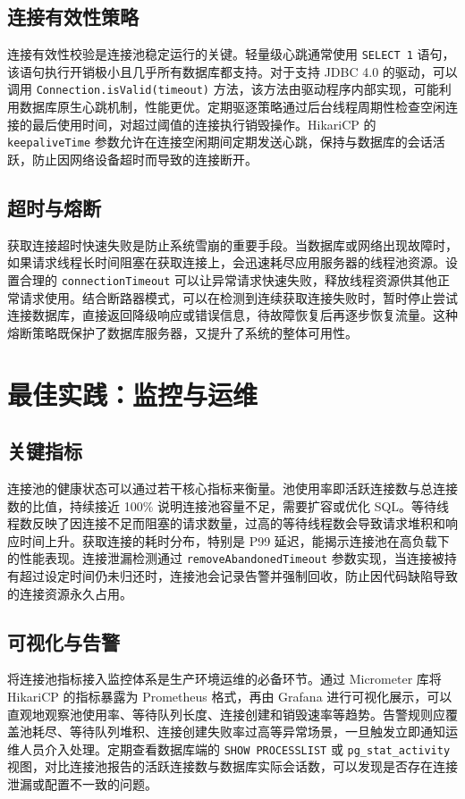 \section{连接有效性策略}
连接有效性校验是连接池稳定运行的关键。轻量级心跳通常使用 \texttt{SELECT 1} 语句，该语句执行开销极小且几乎所有数据库都支持。对于支持 JDBC 4.0 的驱动，可以调用 \texttt{Connection.isValid(timeout)} 方法，该方法由驱动程序内部实现，可能利用数据库原生心跳机制，性能更优。定期驱逐策略通过后台线程周期性检查空闲连接的最后使用时间，对超过阈值的连接执行销毁操作。HikariCP 的 \texttt{keepaliveTime} 参数允许在连接空闲期间定期发送心跳，保持与数据库的会话活跃，防止因网络设备超时而导致的连接断开。\par
\section{超时与熔断}
获取连接超时快速失败是防止系统雪崩的重要手段。当数据库或网络出现故障时，如果请求线程长时间阻塞在获取连接上，会迅速耗尽应用服务器的线程池资源。设置合理的 \texttt{connectionTimeout} 可以让异常请求快速失败，释放线程资源供其他正常请求使用。结合断路器模式，可以在检测到连续获取连接失败时，暂时停止尝试连接数据库，直接返回降级响应或错误信息，待故障恢复后再逐步恢复流量。这种熔断策略既保护了数据库服务器，又提升了系统的整体可用性。\par
\chapter{最佳实践：监控与运维}
\section{关键指标}
连接池的健康状态可以通过若干核心指标来衡量。池使用率即活跃连接数与总连接数的比值，持续接近 100\%{} 说明连接池容量不足，需要扩容或优化 SQL。等待线程数反映了因连接不足而阻塞的请求数量，过高的等待线程数会导致请求堆积和响应时间上升。获取连接的耗时分布，特别是 P99 延迟，能揭示连接池在高负载下的性能表现。连接泄漏检测通过 \texttt{removeAbandonedTimeout} 参数实现，当连接被持有超过设定时间仍未归还时，连接池会记录告警并强制回收，防止因代码缺陷导致的连接资源永久占用。\par
\section{可视化与告警}
将连接池指标接入监控体系是生产环境运维的必备环节。通过 Micrometer 库将 HikariCP 的指标暴露为 Prometheus 格式，再由 Grafana 进行可视化展示，可以直观地观察池使用率、等待队列长度、连接创建和销毁速率等趋势。告警规则应覆盖池耗尽、等待队列堆积、连接创建失败率过高等异常场景，一旦触发立即通知运维人员介入处理。定期查看数据库端的 \texttt{SHOW PROCESSLIST} 或 \texttt{pg\_{}stat\_{}activity} 视图，对比连接池报告的活跃连接数与数据库实际会话数，可以发现是否存在连接泄漏或配置不一致的问题。\par
